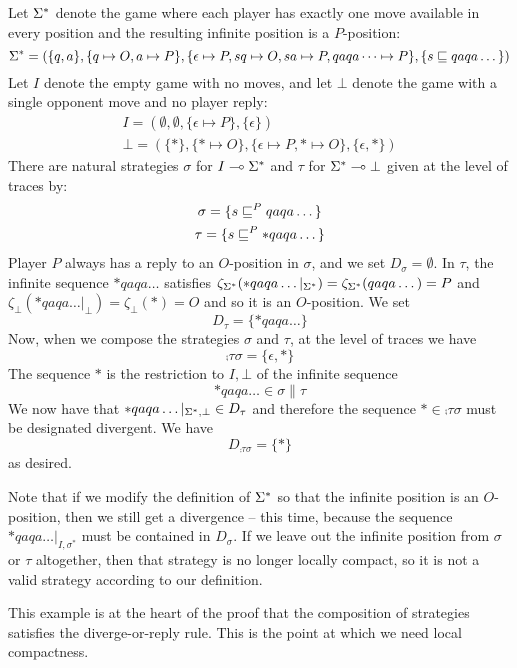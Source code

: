 \documentclass{article}
\begin{document}
\begin{example}
  Let ${\Sigma^*}$ denote the game where each player has exactly one move available in every position and the resulting infinite position is a $P$-position:
  \[
    {\Sigma^*} = (\{q, a\}, \{q\mapsto O, a\mapsto P\}, \{\epsilon\mapsto P,sq\mapsto O,sa\mapsto P,qaqa\dots\mapsto P\}, \{s\sqsubseteq qaqa\dots\})
    \]
  Let $I$ denote the empty game with no moves, and let $\bot$ denote the game with a single opponent move and no player reply:
  \begin{gather*}
    I = (\emptyset, \emptyset, \{\epsilon\mapsto P\}, \{\epsilon\}) \\
    \bot = (\{*\}, \{*\mapsto O\}, \{\epsilon\mapsto P, *\mapsto O\}, \{\epsilon, *\})
  \end{gather*}
  There are natural strategies $\sigma$ for $I\multimap{\Sigma^*}$ and $\tau$ for ${\Sigma^*}\multimap\bot$ given at the level of traces by:
  \begin{gather*}
    \sigma = \{s \sqsubseteq^P qaqa\dots\} \\
    \tau = \{s \sqsubseteq^P *qaqa\dots\}
  \end{gather*}
  Player $P$ always has a reply to an $O$-position in $\sigma$, and we set $D_\sigma = \emptyset$.  In $\tau$, the infinite sequence $*qaqa\dots$ satisfies $\zeta_{{\Sigma^*}}(*qaqa\dots\vert_{{\Sigma^*}}) = \zeta_{{\Sigma^*}}(qaqa\dots) = P$ and $\zeta_{\bot}(*qaqa\dots\vert_{\bot}) = \zeta_{\bot}(*) = O$ and so it is an $O$-position.  We set
  \[
    D_\tau = \{*qaqa\dots\}
    \]
  Now, when we compose the strategies $\sigma$ and $\tau$, at the level of traces we have
  \[
    \comp\tau\sigma = \{\epsilon, *\}
    \]
  The sequence $*$ is the restriction to $I,\bot$ of the infinite sequence
  \[
    *qaqa\dots \in \sigma\|\tau
    \]
  We now have that $*qaqa\dots\vert_{{\Sigma^*},\bot}\in D_\tau$ and therefore the sequence $*\in\comp\tau\sigma$ must be designated divergent.  We have
  \[
    D_{\comp\tau\sigma} = \{*\}
    \]
  as desired.

  Note that if we modify the definition of ${\Sigma^*}$ so that the infinite position is an $O$-position, then we still get a divergence -- this time, because the sequence $*qaqa\dots\vert_{I,\sigma^*}$ must be contained in $D_\sigma$.  If we leave out the infinite position from $\sigma$ or $\tau$ altogether, then that strategy is no longer locally compact, so it is not a valid strategy according to our definition.
\end{example}

This example is at the heart of the proof that the composition of strategies satisfies the diverge-or-reply rule.  This is the point at which we need local compactness.
\end{document}
